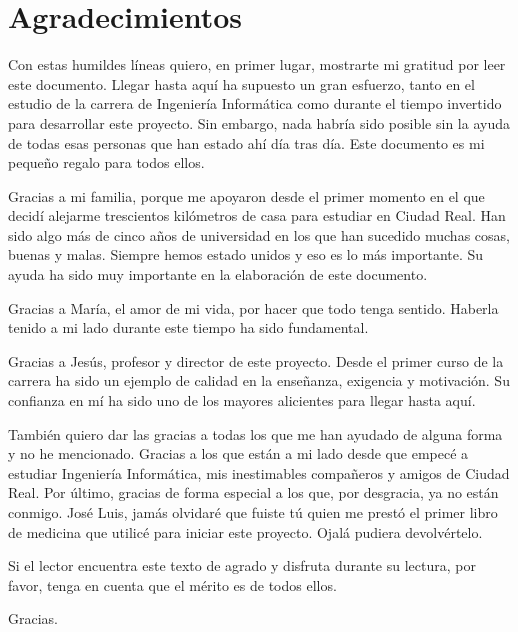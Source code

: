
\chapter{Agradecimientos}

Con estas humildes líneas quiero, en primer lugar, mostrarte mi gratitud por leer este documento. Llegar hasta aquí ha supuesto un gran esfuerzo, tanto en el estudio de la carrera de Ingeniería Informática como durante el tiempo invertido para desarrollar este proyecto. Sin embargo, nada habría sido posible sin la ayuda de todas esas personas que han estado ahí día tras día. Este documento es mi pequeño regalo para todos ellos.

Gracias a mi familia, porque me apoyaron desde el primer momento en el que decidí alejarme trescientos kilómetros de casa para estudiar en Ciudad Real. Han sido algo más de cinco años de universidad en los que han sucedido muchas cosas, buenas y malas. Siempre hemos estado unidos y eso es lo más importante. Su ayuda ha sido muy importante en la elaboración de este documento.

Gracias a María, el amor de mi vida, por hacer que todo tenga sentido. Haberla tenido a mi lado durante este tiempo ha sido fundamental.

Gracias a Jesús, profesor y director de este proyecto. Desde el primer curso de la carrera ha sido un ejemplo de calidad en la enseñanza, exigencia y motivación. Su confianza en mí ha sido uno de los mayores alicientes para llegar hasta aquí.

También quiero dar las gracias a todas los que me han ayudado de alguna forma y no he mencionado. Gracias a los que están a mi lado desde que empecé a estudiar Ingeniería Informática, mis inestimables compañeros y amigos de Ciudad Real. Por último, gracias de forma especial a los que, por desgracia, ya no están conmigo. José Luis, jamás olvidaré que fuiste tú quien me prestó el primer libro de medicina que utilicé para iniciar este proyecto. Ojalá pudiera devolvértelo.

Si el lector encuentra este texto de agrado y disfruta durante su lectura, por favor, tenga en cuenta que el mérito es de todos ellos.

Gracias.




